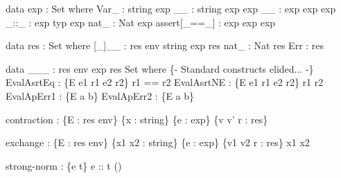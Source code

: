 data exp : Set where
  Var\_         : string \altRArr exp
  \altCdot\altLamb\_\altCdot\_         : string \altRArr exp \altRArr exp
  \_\altCirc\_          : exp \altRArr exp \altRArr exp
  \_::\_         : exp \altRArr typ \altRArr exp
  nat_         : Nat \altRArr exp
  assert[\_==\_] : exp \altRArr exp \altRArr exp

data res : Set where
  [\_]\altLamb\_\altCdot\_ : res env \altRArr string \altRArr exp \altRArr res
  nat_   \hspace{0.04in}: Nat \altRArr res
  Err    \hspace{0.04in}: res

data \_\altVdash\_\altRARR\_ : res env \altRArr exp \altRArr res \altRArr Set where
  \{- Standard constructs elided... -\}
  EvalAsrtEq : \altFAll\{E e1 r1 e2 r2\} \altRArr
       \altRArr
       \altRArr
      r1 == r2 \altRArr
  EvalAsrtNE : \altFAll\{E e1 r1 e2 r2\} \altRArr
       \altRArr
       \altRArr
      r1 \altNE r2 \altRArr
  EvalApErr1 : \altFAll\{E a b\} \altRArr
       \altRArr
  EvalApErr2 : \altFAll\{E a b\} \altRArr
       \altRArr

contraction : \{E : res env\} \{x : string\} \{e : exp\} \{v v' r : res\} \altRArr
    \altRArr

exchange : \{E : res env\} \{x1 x2 : string\} \{e : exp\} \{v1 v2 r : res\} \altRArr
   x1 \altNE x2 \altRArr
    \altRArr

strong-norm : \altFAll\{\altGam e t\} \altRArr \altGam \altVdash e :: t \altRArr {} ()
